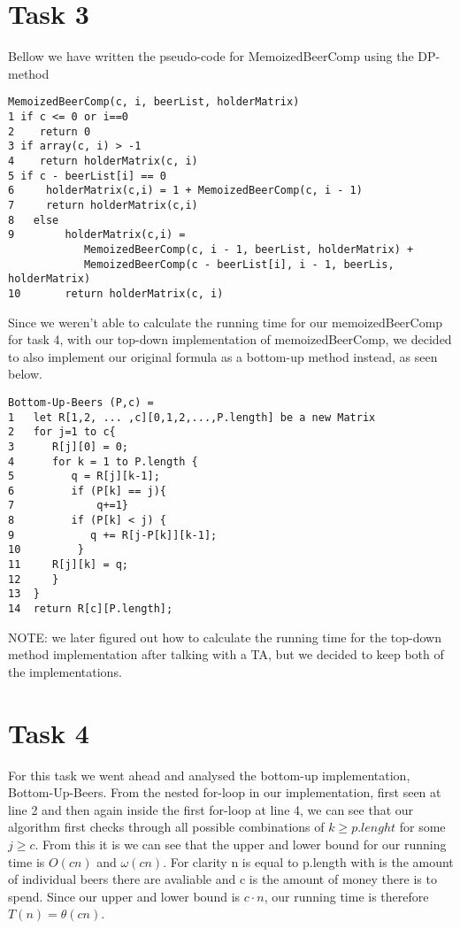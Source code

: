 \documentclass[12pt]{article}
\begin{document}
\section{Task 3}
Bellow we have written the pseudo-code for MemoizedBeerComp using the DP-method\\
\begin{verbatim}
MemoizedBeerComp(c, i, beerList, holderMatrix)
1 if c <= 0 or i==0
2    return 0
3 if array(c, i) > -1
4    return holderMatrix(c, i)
5 if c - beerList[i] == 0
6     holderMatrix(c,i) = 1 + MemoizedBeerComp(c, i - 1)
7     return holderMatrix(c,i)
8   else
9        holderMatrix(c,i) =
            MemoizedBeerComp(c, i - 1, beerList, holderMatrix) +
            MemoizedBeerComp(c - beerList[i], i - 1, beerLis, holderMatrix)
10       return holderMatrix(c, i)
\end{verbatim}
Since we weren't able to calculate the running time for our memoizedBeerComp for task 4, with our top-down implementation of memoizedBeerComp, we decided to also implement our original formula as a bottom-up method instead, as seen below.
\begin{verbatim}
Bottom-Up-Beers (P,c) = 
1   let R[1,2, ... ,c][0,1,2,...,P.length] be a new Matrix
2   for j=1 to c{
3      R[j][0] = 0;
4      for k = 1 to P.length {
5         q = R[j][k-1];
6         if (P[k] == j){ 
7             q+=1}   
8         if (P[k] < j) {
9            q += R[j-P[k]][k-1];
10         }
11     R[j][k] = q;	
12     }
13  }
14	return R[c][P.length];
\end{verbatim}
NOTE: we later figured out how to calculate the running time for the top-down method implementation after talking with a TA, but we decided to keep both of the implementations.
\section{Task 4}
For this task we went ahead and analysed the bottom-up implementation, Bottom-Up-Beers. From the nested for-loop in our implementation, first seen at line 2 and then again inside the first for-loop at line 4, we can see that our algorithm first checks through all possible combinations of $k \geq p.lenght$ for some $j \geq c$. From this it is we can see that the upper and lower bound for our running time is $O(cn)$ and $\omega(cn)$. For clarity n is equal to p.length with is the amount of individual beers there are avaliable and c is the amount of money there is to spend. Since our upper and lower bound is $c \cdot n$, our running time is therefore $T(n) = \theta(cn)$.\\
\end{document}
